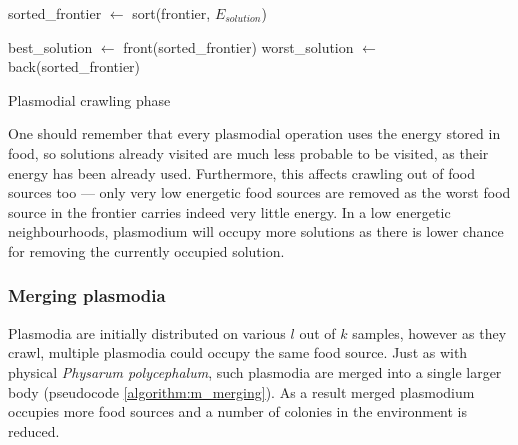 \documentclass[english,a4paper,twoside]{ppfcmthesis}
\begin{document}
\begin{algorithm}
  \BlankLine


  sorted\_frontier $\leftarrow$ sort(frontier, $E_{solution}$)\;

  best\_solution $\leftarrow$ front(sorted\_frontier)\;
  worst\_solution $\leftarrow$ back(sorted\_frontier)\;


  \;

  \caption{Plasmodial crawling phase}
  \label{algorithm:m_crawling}
\end{algorithm}

One should remember that every plasmodial operation uses the energy stored in food, so solutions already visited are much less probable to be visited, as their energy has been already used. Furthermore, this affects crawling out of food sources too --- only very low energetic food sources are removed as the worst food source in the frontier carries indeed very little energy. In a low energetic neighbourhoods, plasmodium will occupy more solutions as there is lower chance for removing the currently occupied solution.


\subsubsection{Merging plasmodia}

Plasmodia are initially distributed on various $l$ out of $k$ samples, however as they crawl, multiple plasmodia could occupy the same food source. Just as with physical \textit{Physarum polycephalum}, such plasmodia are merged into a single larger body (pseudocode \ref{algorithm:m_merging}). As a result merged plasmodium occupies more food sources and a number of colonies in the environment is reduced. 
\end{document}
